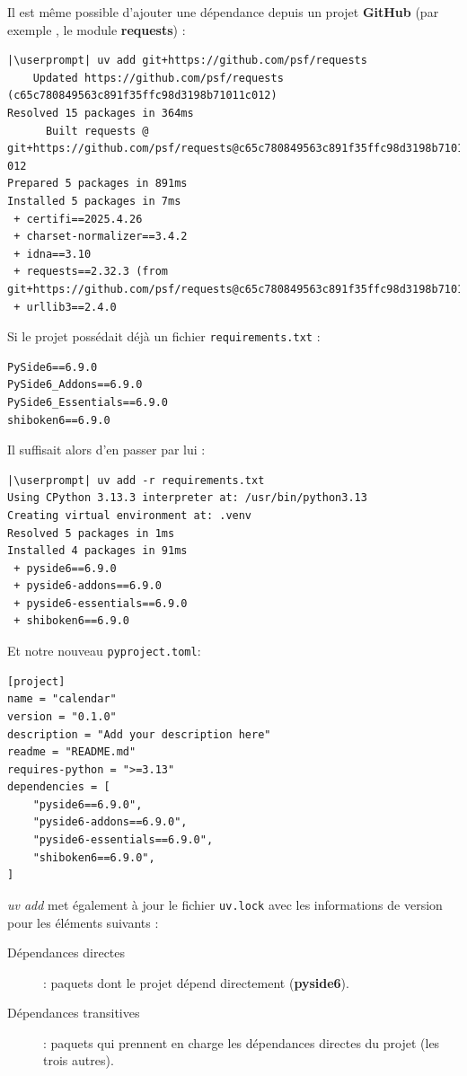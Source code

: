 Il est même possible d'ajouter une dépendance depuis un projet \textbf{GitHub} (par exemple , le module \textbf{requests}) :
\begin{lstlisting}[style=bash]
|\userprompt| uv add git+https://github.com/psf/requests
    Updated https://github.com/psf/requests (c65c780849563c891f35ffc98d3198b71011c012)
Resolved 15 packages in 364ms
      Built requests @ git+https://github.com/psf/requests@c65c780849563c891f35ffc98d3198b71011c 012
Prepared 5 packages in 891ms
Installed 5 packages in 7ms
 + certifi==2025.4.26
 + charset-normalizer==3.4.2
 + idna==3.10
 + requests==2.32.3 (from git+https://github.com/psf/requests@c65c780849563c891f35ffc98d3198b71011c012)
 + urllib3==2.4.0
\end{lstlisting}

Si le projet possédait déjà un fichier \texttt{requirements.txt} : 
\begin{lstlisting}[style=file]
PySide6==6.9.0
PySide6_Addons==6.9.0
PySide6_Essentials==6.9.0
shiboken6==6.9.0
\end{lstlisting}

Il suffisait alors d'en passer par lui :
\begin{lstlisting}[style=bash]
|\userprompt| uv add -r requirements.txt
Using CPython 3.13.3 interpreter at: /usr/bin/python3.13
Creating virtual environment at: .venv
Resolved 5 packages in 1ms
Installed 4 packages in 91ms
 + pyside6==6.9.0
 + pyside6-addons==6.9.0
 + pyside6-essentials==6.9.0
 + shiboken6==6.9.0
\end{lstlisting}

Et notre nouveau \texttt{pyproject.toml}:
\begin{lstlisting}[style=file]
[project]
name = "calendar"
version = "0.1.0"
description = "Add your description here"
readme = "README.md"
requires-python = ">=3.13"
dependencies = [
    "pyside6==6.9.0",
    "pyside6-addons==6.9.0",
    "pyside6-essentials==6.9.0",
    "shiboken6==6.9.0",
]
\end{lstlisting}

\textit{uv add} met également à jour le fichier \texttt{uv.lock} avec les informations de version pour les éléments suivants :
\begin{description}
    \item[Dépendances directes] : paquets dont le projet dépend directement (\textbf{pyside6}). 
    \item[Dépendances transitives] : paquets qui prennent en charge les dépendances directes du projet (les trois autres).
\end{description}

